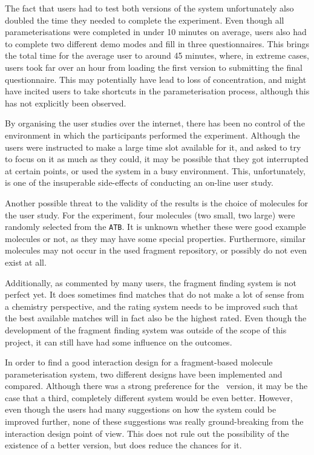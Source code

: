 The fact that users had to test both versions of the system unfortunately also doubled the time they needed to complete the experiment. Even though all parameterisations were completed in under 10 minutes on average, users also had to complete two different demo modes and fill in three questionnaires. This brings the total time for the average user to around 45 minutes, where, in extreme cases, users took far over an hour from loading the first version to submitting the final questionnaire. This may potentially have lead to loss of concentration, and might have incited users to take shortcuts in the parameterisation process, although this has not explicitly been observed.

By organising the user studies over the internet, there has been no control of the environment in which the participants performed the experiment. Although the users were instructed to make a large time slot available for it, and asked to try to focus on it as much as they could, it may be possible that they got interrupted at certain points, or used the system in a busy environment. This, unfortunately, is one of the insuperable side-effects of conducting an on-line user study.

Another possible threat to the validity of the results is the choice of molecules for the user study. For the experiment, four molecules (two small, two large) were randomly selected from the \verb|ATB|. It is unknown whether these were good example molecules or not, as they may have some special properties. Furthermore, similar molecules may not occur in the used fragment repository, or possibly do not even exist at all.

Additionally, as commented by many users, the fragment finding system is not perfect yet. It does sometimes find matches that do not make a lot of sense from a chemistry perspective, and the rating system needs to be improved such that the best available matches will in fact also be the highest rated. Even though the development of the fragment finding system was outside of the scope of this project, it can still have had some influence on the outcomes.

In order to find a good interaction design for a fragment-based molecule parameterisation system, two different designs have been implemented and compared. Although there was a strong preference for the \IDa\ version, it may be the case that a third, completely different system would be even better. However, even though the users had many suggestions on how the system could be improved further, none of these suggestions was really ground-breaking from the interaction design point of view. This does not rule out the possibility of the existence of a better version, but does reduce the chances for it.

